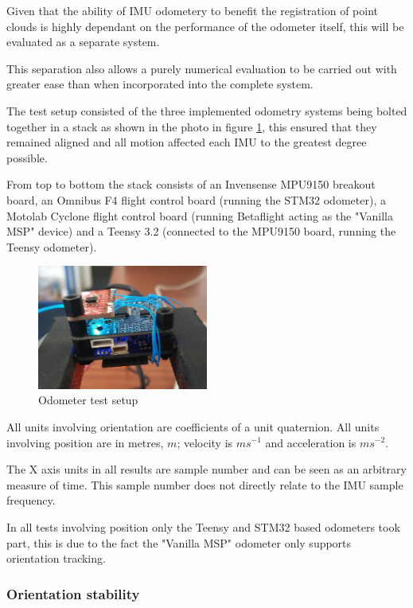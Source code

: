 \documentclass{entcs}
\begin{document}
Given that the ability of IMU odometery to benefit the registration of point
clouds is highly dependant on the performance of the odometer itself, this will
be evaluated as a separate system.

This separation also allows a purely numerical evaluation to be carried out with
greater ease than when incorporated into the complete system.

The test setup consisted of the three implemented odometry systems being bolted
together in a stack as shown in the photo in figure \ref{fig:imu_test_setup},
this ensured that they remained aligned and all motion affected each IMU to the
greatest degree possible.

From top to bottom the stack consists of an Invensense MPU9150 breakout board,
an Omnibus F4 flight control board (running the STM32 odometer), a Motolab
Cyclone flight control board (running Betaflight acting as the "Vanilla MSP"
device) and a Teensy 3.2 (connected to the MPU9150 board, running the Teensy
odometer).

\begin{figure}[h!]
  \centering
  \includegraphics[width=0.5\textwidth]{graphics/imu_test_setup.eps}
  \caption{Odometer test setup}
  \label{fig:imu_test_setup}
\end{figure}

All units involving orientation are coefficients of a unit quaternion. All units
involving position are in metres, $m$; velocity is $ms^{-1}$ and acceleration is
$ms^{-2}$.

The X axis units in all results are sample number and can be seen as an
arbitrary measure of time. This sample number does not directly relate to the
IMU sample frequency.

In all tests involving position only the Teensy and STM32 based odometers took
part, this is due to the fact the "Vanilla MSP" odometer only supports
orientation tracking.

\subsubsection{Orientation stability}
\end{document}
